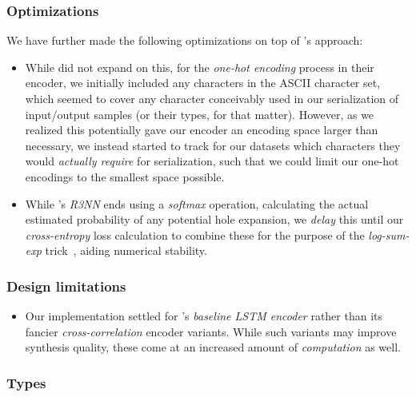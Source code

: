 \documentclass{article}
\begin{document}
\subsubsection{Optimizations}

We have further made the following optimizations on top of \citet{nsps}'s approach:
\begin{itemize}
    \item While \citet{nsps} did not expand on this,
    for the \emph{one-hot encoding} process in their encoder,
    we initially included any characters in the ASCII character set,
    which seemed to cover any character conceivably used in our serialization of input/output samples (or their types, for that matter).
    However, as we realized this potentially gave our encoder an encoding space larger than necessary,
    we instead started to track for our datasets which characters they would \emph{actually require} for serialization,
    such that we could limit our one-hot encodings to the smallest space possible.
    \item While \citet{nsps}'s \emph{R3NN} ends using a \emph{softmax} operation,
    calculating the actual estimated probability of any potential hole expansion,
    we \emph{delay} this until our \emph{cross-entropy} loss calculation to combine these for the purpose of the \emph{log-sum-exp} trick~\citep{eisele2016log},
    aiding numerical stability.
\end{itemize}

\subsubsection{Design limitations}

\begin{itemize}
    \item Our implementation settled for \cite{nsps}'s \emph{baseline LSTM encoder} rather than its fancier \emph{cross-correlation} encoder variants.
    While such variants may improve synthesis quality,
    these come at an increased amount of \emph{computation} as well.
\end{itemize}

\subsubsection{Types}

\end{document}
